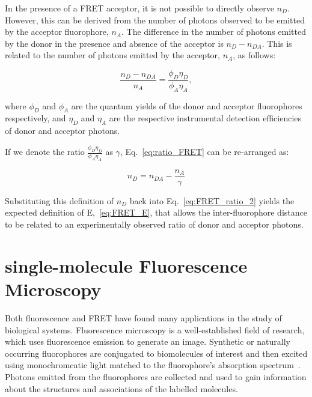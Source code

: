 In the presence of a FRET acceptor, it is not possible to directly observe $n_D$. However, this can be derived from the number of photons observed to be emitted by the acceptor fluorophore, $n_A$. The difference in the number of photons emitted by the donor in the presence and absence of the acceptor is $n_D - n_{DA}$. This is related to the number of photons emitted by the acceptor, $n_A$, as follows:

\begin{equation}
\frac{n_D - n_{DA}}{n_A} = \frac{\phi_D\eta_D}{\phi_A\eta_A},
\label{eq:ratio_FRET}
\end{equation}

where $\phi_D$ and $\phi_A$ are the quantum yields of the donor and acceptor fluorophores respectively, and $\eta_D$ and $\eta_A$ are the respective instrumental detection efficiencies of donor and acceptor photons.

If we denote the ratio $\frac{\phi_D\eta_D}{\phi_A\eta_A}$ as $\gamma$, Eq.~\ref{eq:ratio_FRET} can be re-arranged as:

\begin{equation}
n_D = n_{DA} - \frac{n_A}{\gamma}
\label{eq:get_gamma}
\end{equation}

Substituting this definition of $n_D$ back into Eq.~\ref{eq:FRET_ratio_2} yields the expected definition of E,~\ref{eq:FRET_E}, that allows the inter-fluorophore distance to be related to an experimentally observed ratio of donor and acceptor photons.

\section{single-molecule Fluorescence Microscopy}
Both fluorescence and FRET have found many applications in the study of biological systems. Fluorescence microscopy is a well-established field of research, which uses fluorescence emission to generate an image. Synthetic or naturally occurring fluorophores are conjugated to biomolecules of interest and then excited using monochromcatic light matched to the fluorophore's absorption spectrum~\cite{Michalet2003}. Photons emitted from the fluorophores are collected and used to gain information about the structures and associations of the labelled molecules. 

